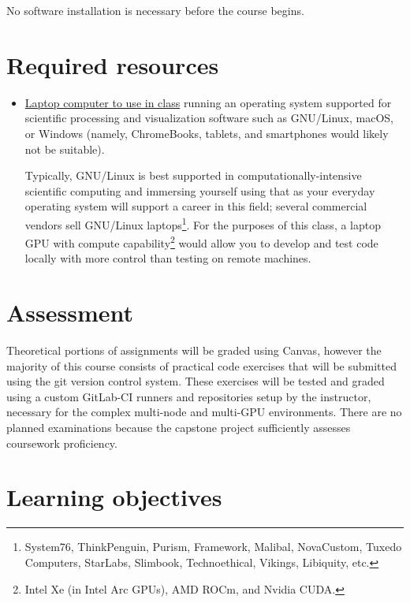 \documentclass[12pt]{article}
\begin{document}
\noindent
No software installation is necessary before the course begins.

\section{Required resources}

\begin{itemize}
\item \ul{Laptop computer to use in class} running an operating system %
  supported for scientific processing and visualization software %
  such as GNU/Linux, macOS, or Windows %
  (namely, ChromeBooks, tablets, and smartphones would likely not be suitable).

  Typically, %
  GNU/Linux is best supported %
  in computationally-intensive scientific computing %
  and immersing yourself using that as your everyday operating system %
  will support a career in this field; %
  several commercial vendors sell GNU/Linux laptops\footnote{%
  System76, ThinkPenguin, Purism, %
  Framework, Malibal, %
  NovaCustom, Tuxedo Computers, StarLabs, Slimbook, %
  Technoethical, Vikings, Libiquity, etc.}.
  For the purposes of this class, %
  a laptop GPU with compute capability\footnote{%
  Intel Xe (in Intel Arc GPUs), AMD ROCm, and Nvidia CUDA.} %
  would allow you to develop and test code locally %
  with more control than testing on remote machines.
\end{itemize}

\section{Assessment}

Theoretical portions of assignments will be graded using Canvas, %
however the majority of this course %
consists of practical code exercises %
that will be submitted using the git version control system.
%
These exercises will be tested and graded using %
a custom GitLab-CI runners and repositories %
setup by the instructor, %
necessary for the complex multi-node and multi-GPU environments.
%
There are no planned examinations %
because the capstone project %
sufficiently assesses coursework proficiency.

\section{Learning objectives}
\end{document}
